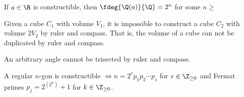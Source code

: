 \documentclass[a4paper]{article}
\begin{document}
\begin{tcorollary}
  If \( a\in\R \) is constructible, then \( \fdeg{\Q(a)}{\Q}=2^n \) for some \( n\geq  \)
\end{tcorollary}

\begin{tcorollary}
  Given a cube \( C_1 \) with volume \( V_1 \), it is impossible to construct a cube \( C_2 \) with volume \( 2V_2 \) by ruler and compass.
  That is, the volume of a cube can not be duplicated by ruler and compass.
\end{tcorollary}

\begin{tcorollary}
  An arbitrary angle cannot be trisected by ruler and compass.
\end{tcorollary}

\begin{ttheorem}
  A regular \( n \)-gon is constructible \( \iff n=2^rp_1p_2\cdots p_s \) for \( r\in\Z_{\geq 0} \) and Fermat primes \( p_j = 2^{\left( 2^k \right)}+1 \) for \( k\in \Z_{\geq 0} \).
\end{ttheorem}


\end{document}
